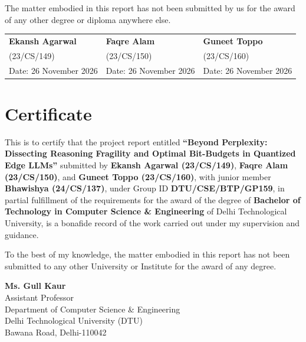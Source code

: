 \documentclass[12pt,a4paper,oneside]{report}
\begin{document}
The matter embodied in this report has not been submitted by us for the award of any other degree or diploma anywhere else.

\vspace{1.5cm}

\noindent
\begin{tabular*}{\textwidth}{@{\extracolsep{\fill}}lll}
\textbf{Ekansh Agarwal} & \textbf{Faqre Alam} & \textbf{Guneet Toppo} \\
(23/CS/149) & (23/CS/150) & (23/CS/160) \\
Date: 26 November 2026 & Date: 26 November 2026 & Date: 26 November 2026
\end{tabular*}

\vspace{1.5cm}

\chapter*{Certificate}

This is to certify that the project report entitled \textbf{``Beyond Perplexity: Dissecting Reasoning Fragility and Optimal Bit-Budgets in Quantized Edge LLMs''} submitted by \textbf{Ekansh Agarwal (23/CS/149)}, \textbf{Faqre Alam (23/CS/150)}, and \textbf{Guneet Toppo (23/CS/160)}, with junior member \textbf{Bhawishya (24/CS/137)}, under Group ID \textbf{DTU/CSE/BTP/GP159}, in partial fulfillment of the requirements for the award of the degree of \textbf{Bachelor of Technology in Computer Science \& Engineering} of Delhi Technological University, is a bonafide record of the work carried out under my supervision and guidance.

To the best of my knowledge, the matter embodied in this report has not been submitted to any other University or Institute for the award of any degree.

\vspace{2.5cm}

\noindent
\textbf{Ms. Gull Kaur}\\
Assistant Professor\\
Department of Computer Science \& Engineering\\
Delhi Technological University (DTU)\\
Bawana Road, Delhi-110042

\end{document}
